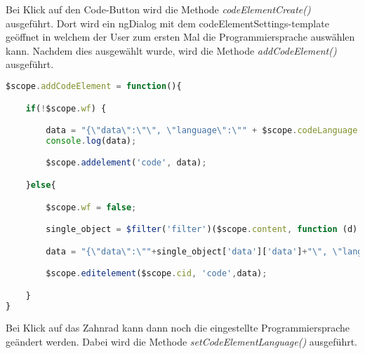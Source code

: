 
Bei Klick auf den Code-Button wird die Methode \textit{codeElementCreate()} ausgeführt. Dort wird ein ngDialog mit dem codeElementSettings-template geöffnet in welchem der User zum ersten Mal die Programmiersprache auswählen kann. Nachdem dies ausgewählt wurde, wird die Methode \textit{addCodeElement()} ausgeführt.

\begin{lstlisting}[caption={Code-Element Persistierung}, language=Javascript]
$scope.addCodeElement = function(){

    if(!$scope.wf) {

        data = "{\"data\":\"\", \"language\":\"" + $scope.codeLanguage + "\"}";
        console.log(data);

        $scope.addelement('code', data);

    }else{

        $scope.wf = false;

        single_object = $filter('filter')($scope.content, function (d) {return d.id === $scope.cid;})[0];

        data = "{\"data\":\""+single_object['data']['data']+"\", \"language\":\"" + $scope.codeLanguage + "\"}";

        $scope.editelement($scope.cid, 'code',data);

    }
}
\end{lstlisting}

Bei Klick auf das Zahnrad kann dann noch die eingestellte Programmiersprache geändert werden. Dabei wird die Methode \textit{setCodeElementLanguage()} ausgeführt.
